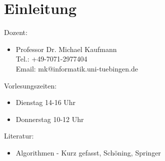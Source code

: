 \section*{Einleitung}
Dozent: 
\begin{itemize}
\item {}Professor Dr. Michael Kaufmann \\
      Tel.: +49-7071-2977404 \\
      Email: mk@informatik.uni-tuebingen.de
\end{itemize}
Vorlesungszeiten:
\begin{itemize}
\item Dienstag 14-16 Uhr 
\item Donnerstag 10-12 Uhr 
\end{itemize}
Literatur:
\begin{itemize}
 \item Algorithmen - Kurz gefasst, Schöning, Springer
\end{itemize}
